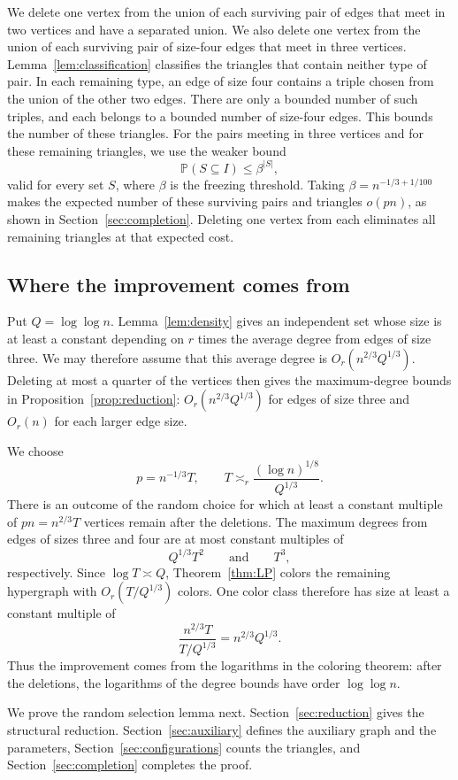 \documentclass[11pt]{article}
\numberwithin{equation}{section}
\theoremstyle{remark}
\newcommand{\Pp}{\mathbb P}
\begin{document}
We delete one vertex from the union of each surviving pair of edges that meet in two vertices and have a separated union. We also delete one vertex from the union of each surviving pair of size-four edges that meet in three vertices. Lemma~\ref{lem:classification} classifies the triangles that contain neither type of pair. In each remaining type, an edge of size four contains a triple chosen from the union of the other two edges. There are only a bounded number of such triples, and each belongs to a bounded number of size-four edges. This bounds the number of these triangles. For the pairs meeting in three vertices and for these remaining triangles, we use the weaker bound
\[
 \Pp(S\subseteq I)\le\beta^{|S|},
\]
valid for every set $S$, where $\beta$ is the freezing threshold. Taking $\beta=n^{-1/3+1/100}$ makes the expected number of these surviving pairs and triangles $o(pn)$, as shown in Section~\ref{sec:completion}. Deleting one vertex from each eliminates all remaining triangles at that expected cost.

\subsection{Where the improvement comes from}
Put $Q=\log\log n$. Lemma~\ref{lem:density} gives an independent set whose size is at least a constant depending on $r$ times the average degree from edges of size three. We may therefore assume that this average degree is $O_r(n^{2/3}Q^{1/3})$. Deleting at most a quarter of the vertices then gives the maximum-degree bounds in Proposition~\ref{prop:reduction}: $O_r(n^{2/3}Q^{1/3})$ for edges of size three and $O_r(n)$ for each larger edge size.

We choose
\[
 p=n^{-1/3}T,
 \qquad
 T\asymp_r\frac{(\log n)^{1/8}}{Q^{1/3}}.
\]
There is an outcome of the random choice for which at least a constant multiple of $pn=n^{2/3}T$ vertices remain after the deletions. The maximum degrees from edges of sizes three and four are at most constant multiples of
\[
 Q^{1/3}T^2\qquad\text{and}\qquad T^3,
\]
respectively. Since $\log T\asymp Q$, Theorem~\ref{thm:LP} colors the remaining hypergraph with $O_r(T/Q^{1/3})$ colors. One color class therefore has size at least a constant multiple of
\[
 \frac{n^{2/3}T}{T/Q^{1/3}}
 =n^{2/3}Q^{1/3}.
\]
Thus the improvement comes from the logarithms in the coloring theorem: after the deletions, the logarithms of the degree bounds have order $\log\log n$.

We prove the random selection lemma next. Section~\ref{sec:reduction} gives the structural reduction. Section~\ref{sec:auxiliary} defines the auxiliary graph and the parameters, Section~\ref{sec:configurations} counts the triangles, and Section~\ref{sec:completion} completes the proof.
\end{document}
